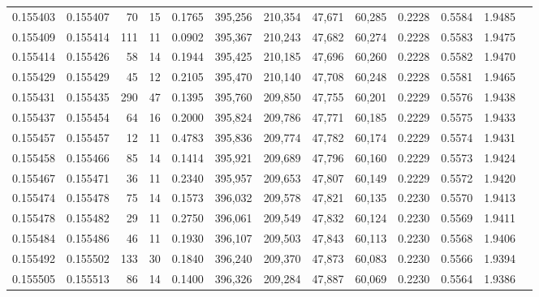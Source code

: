 \begin{tabular}{rrrrrrrrrrrrr}
0.155403 & 0.155407 &    70 &  15 &                                     0.1765 & 395,256 & 210,354 &  47,671 &  60,285 & 0.2228 & 0.5584 & 1.9485 \\
0.155409 & 0.155414 &   111 &  11 &                                     0.0902 & 395,367 & 210,243 &  47,682 &  60,274 & 0.2228 & 0.5583 & 1.9475 \\
0.155414 & 0.155426 &    58 &  14 &                                     0.1944 & 395,425 & 210,185 &  47,696 &  60,260 & 0.2228 & 0.5582 & 1.9470 \\
0.155429 & 0.155429 &    45 &  12 &                                     0.2105 & 395,470 & 210,140 &  47,708 &  60,248 & 0.2228 & 0.5581 & 1.9465 \\
0.155431 & 0.155435 &   290 &  47 &                                     0.1395 & 395,760 & 209,850 &  47,755 &  60,201 & 0.2229 & 0.5576 & 1.9438 \\
0.155437 & 0.155454 &    64 &  16 &                                     0.2000 & 395,824 & 209,786 &  47,771 &  60,185 & 0.2229 & 0.5575 & 1.9433 \\
0.155457 & 0.155457 &    12 &  11 &                                     0.4783 & 395,836 & 209,774 &  47,782 &  60,174 & 0.2229 & 0.5574 & 1.9431 \\
0.155458 & 0.155466 &    85 &  14 &                                     0.1414 & 395,921 & 209,689 &  47,796 &  60,160 & 0.2229 & 0.5573 & 1.9424 \\
0.155467 & 0.155471 &    36 &  11 &                                     0.2340 & 395,957 & 209,653 &  47,807 &  60,149 & 0.2229 & 0.5572 & 1.9420 \\
0.155474 & 0.155478 &    75 &  14 &                                     0.1573 & 396,032 & 209,578 &  47,821 &  60,135 & 0.2230 & 0.5570 & 1.9413 \\
0.155478 & 0.155482 &    29 &  11 &                                     0.2750 & 396,061 & 209,549 &  47,832 &  60,124 & 0.2230 & 0.5569 & 1.9411 \\
0.155484 & 0.155486 &    46 &  11 &                                     0.1930 & 396,107 & 209,503 &  47,843 &  60,113 & 0.2230 & 0.5568 & 1.9406 \\
0.155492 & 0.155502 &   133 &  30 &                                     0.1840 & 396,240 & 209,370 &  47,873 &  60,083 & 0.2230 & 0.5566 & 1.9394 \\
0.155505 & 0.155513 &    86 &  14 &                                     0.1400 & 396,326 & 209,284 &  47,887 &  60,069 & 0.2230 & 0.5564 & 1.9386 \\

\end{tabular}
